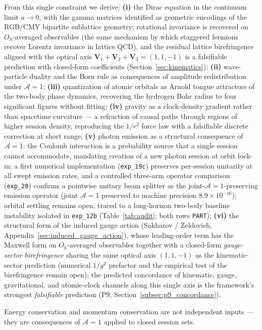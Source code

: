 From this single constraint we derive:
\textbf{(i)} the Dirac equation in the continuum limit $a\to 0$, with the
gamma matrices identified as geometric encodings of the RGB/CMY bipartite
sublattice geometry; rotational invariance is recovered on
$O_h$-averaged observables (the same mechanism by which staggered fermions
recover Lorentz invariance in lattice QCD), and the residual lattice
birefringence aligned with the optical axis
$\mathbf{V}_1+\mathbf{V}_2+\mathbf{V}_3 = (1,1,-1)$ is a falsifiable
prediction with closed-form coefficients (Section~\ref{sec:kinematics});
\textbf{(ii)} wave-particle duality and the Born rule as consequences of
amplitude redistribution under $\mathcal{A}=1$;
\textbf{(iii)} quantization of atomic orbitals as Arnold tongue attractors of
the two-body phase dynamics, recovering the hydrogen Bohr radius to four
significant figures without fitting;
\textbf{(iv)} gravity as a clock-density gradient rather than spacetime
curvature --- a refraction of causal paths through regions of higher
session density, reproducing the $1/r^2$ force law with a falsifiable
discrete correction at short range;
\textbf{(v)} photon emission as a structural consequence of $\mathcal{A}=1$:
the Coulomb interaction is a probability source that a single session cannot
accommodate, mandating creation of a new photon session at orbit lock-in;
a first numerical implementation (\texttt{exp\_19c}) preserves per-session
unitarity at all swept emission rates, and a controlled three-arm operator
comparison (\texttt{exp\_20}) confirms a pointwise unitary beam splitter
as the joint-$\mathcal{A}=1$-preserving emission operator (joint
$\mathcal{A}=1$ preserved to machine precision $8.9\!\times\!10^{-16}$);
orbital settling remains open, traced to a long-horizon two-body baseline
instability isolated in \texttt{exp\_12b} (Table~\ref{tab:audit};
both rows \texttt{PART});
\textbf{(vi)} the structural form of the induced gauge action
(Sakharov / Zeldovich, Appendix~\ref{sec:induced_gauge_action}), whose
leading-order term has the Maxwell form on $O_h$-averaged observables
together with a closed-form \emph{gauge-sector birefringence} sharing
the same optical axis $(1,1,-1)$ as the kinematic-sector prediction
(numerical $1/g^2$ prefactor and the empirical test of the birefringence
remain open); the predicted concordance of kinematic, gauge,
gravitational, and atomic-clock channels along this single axis is the
framework's strongest \emph{falsifiable} prediction
(P9, Section~\ref{subsec:p9_concordance}).

Energy conservation and momentum conservation are not independent inputs ---
they are consequences of $\mathcal{A}=1$ applied to closed session sets.

